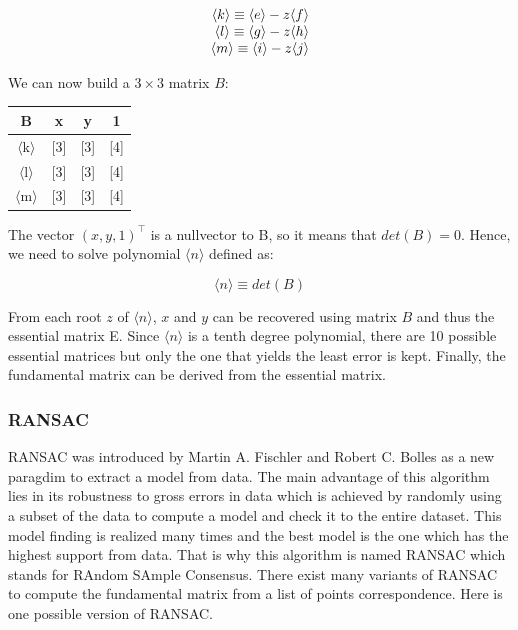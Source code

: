 \documentclass[12pt]{article}
\begin{document}
\[
  \begin{array}{r c l}
    \langle k \rangle \equiv \langle e \rangle - z \langle f \rangle \\
    \langle l \rangle \equiv \langle g \rangle - z \langle h \rangle \\
    \langle m \rangle \equiv \langle i \rangle - z \langle j \rangle \\
  \end{array}
\]

We can now build a $3\times 3$ matrix $B$:

\begin{center}
\begin{tabular}{|c| c c c|}
  \hline
  B & x & y & 1 \\
  \hline
  $\langle$k$\rangle$ & [3] & [3] & [4] \\
  $\langle$l$\rangle$ & [3] & [3] & [4] \\
  $\langle$m$\rangle$ & [3] & [3] & [4] \\
  \hline
\end{tabular}
\end{center}

The vector $(x, y, 1)^\top$ is a nullvector to B, so it means that $det(B) = 0$. Hence, we need to solve polynomial $\langle n\rangle$ defined as:

\begin{equation}
  \langle n \rangle \equiv det(B)
\end{equation}

From each root $z$ of $\langle n\rangle$, $x$ and $y$ can be recovered using matrix $B$ and thus the essential matrix E. Since $\langle n \rangle$ is a tenth degree polynomial, there are 10 possible essential matrices but only the one that yields the least error is kept. Finally, the fundamental matrix can be derived from the essential matrix.


\subsubsection{RANSAC}

RANSAC\cite{Ransac81} was introduced by Martin A. Fischler and Robert C. Bolles as a new paragdim to extract a model from data. The main advantage of this algorithm lies in its robustness to gross errors in data which is achieved by randomly using a subset of the data to compute a model and check it to the entire dataset. This model finding is realized many times and the best model is the one which has the highest support from data. That is why this algorithm is named RANSAC which stands for RAndom SAmple Consensus. 
There exist many variants of RANSAC to compute the fundamental matrix from a list of points correspondence. Here is one possible version of RANSAC.
\end{document}
